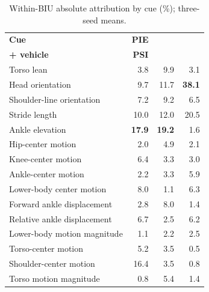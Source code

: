 \begin{table}[!htbp]
\centering
\caption{Within-BIU absolute attribution by cue (\%); three-seed means.}
\label{tab:ch4_v2_cue_importance}
\begin{tabularx}{\textwidth}{@{}Xrrr@{}}
\toprule
\textbf{Cue} & \textbf{PIE} & \shortstack{\textbf{JAAD clean}\\\textbf{+ vehicle}} & \textbf{PSI}\\
\midrule
Torso lean & 3.8 & 9.9 & 3.1\\
Head orientation & 9.7 & 11.7 & \textbf{38.1}\\
Shoulder-line orientation & 7.2 & 9.2 & 6.5\\
Stride length & 10.0 & 12.0 & 20.5\\
Ankle elevation & \textbf{17.9} & \textbf{19.2} & 1.6\\
Hip-center motion & 2.0 & 4.9 & 2.1\\
Knee-center motion & 6.4 & 3.3 & 3.0\\
Ankle-center motion & 2.2 & 3.3 & 5.9\\
Lower-body center motion & 8.0 & 1.1 & 6.3\\
Forward ankle displacement & 2.8 & 8.0 & 1.4\\
Relative ankle displacement & 6.7 & 2.5 & 6.2\\
Lower-body motion magnitude & 1.1 & 2.2 & 2.5\\
Torso-center motion & 5.2 & 3.5 & 0.5\\
Shoulder-center motion & 16.4 & 3.5 & 0.8\\
Torso motion magnitude & 0.8 & 5.4 & 1.4\\
\bottomrule
\end{tabularx}
\end{table}
